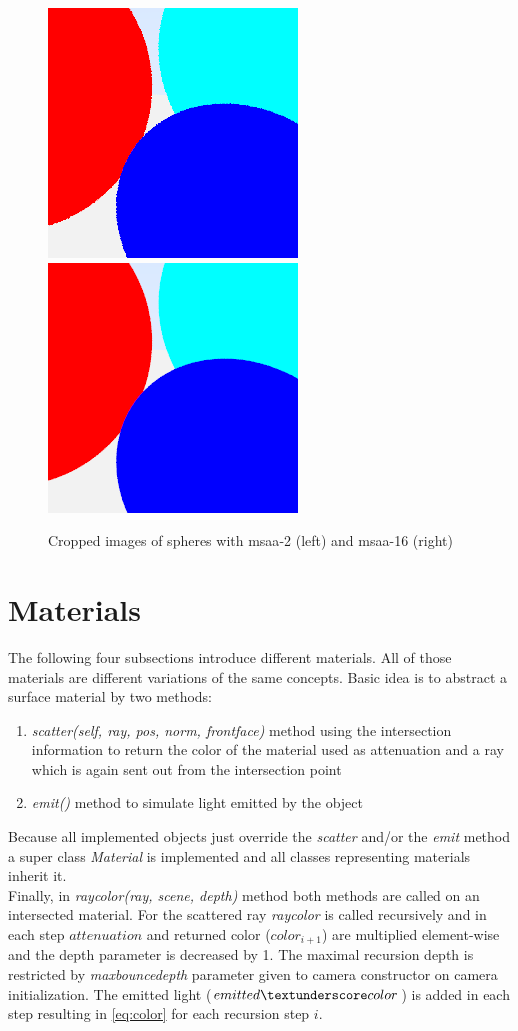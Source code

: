 \documentclass[]{article}
\begin{document}
	\begin{figure}[h]
		\centering
		\includegraphics[width=0.45\linewidth]{image4-2-zoom}
		\includegraphics[width=0.45\linewidth]{image4-5-zoom}
		\caption{Cropped images of spheres with \ac{msaa}-2 (left) and \ac{msaa}-16 (right)}
		\label{fig:image4}
	\end{figure}
	
	\section{Materials}
		The following four subsections introduce different materials. All of those materials are different variations of the same concepts. Basic idea is to abstract a surface material by two methods:
		\begin{enumerate}
			\item{\emph{scatter(self, ray, pos, norm, front\textunderscore face)} method using the intersection information to return the color of the material used as attenuation and a ray which is again sent out from the intersection point}
			\item{\emph{emit()} method to simulate light emitted by the object}
		\end{enumerate}
		Because all implemented objects just override the \emph{scatter} and/or the \emph{emit} method a super class \emph{Material} is implemented and all classes representing materials inherit it.
		\\
		Finally, in \emph{ray\textunderscore color(ray, scene, depth)} method both methods are called on an intersected material. For the scattered ray \emph{ray\textunderscore color} is called recursively and in each step $attenuation$ and returned color ($color_{i+1}$) are multiplied element-wise and the depth parameter is decreased by 1. The maximal recursion depth is restricted by \emph{max\textunderscore bounce\textunderscore depth} parameter given to camera constructor on camera initialization. The emitted light ($emitted\textunderscore color$) is added in each step resulting in \cref{eq:color} for each recursion step $i$.
			
\end{document}
